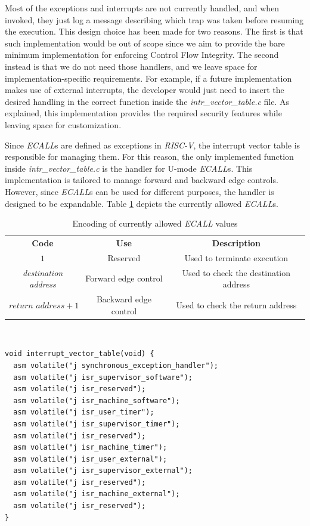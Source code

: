 Most of the exceptions and interrupts are not currently handled, and when invoked,
they just log a message describing which trap was taken before resuming the
execution. This design choice has been made for two reasons. The first is that
such implementation would be out of scope since we aim to provide the bare
minimum implementation for enforcing Control Flow Integrity. The second instead is
that we do not need those handlers, and we leave space for implementation-specific
requirements. For example, if a future implementation makes use of external
interrupts, the developer would just need to insert the desired handling in the correct
function inside the \textit{intr\_vector\_table.c} file. As explained, this
implementation provides the required security features while leaving space for
customization.

Since \textit{ECALL}s are defined as exceptions in \textit{RISC-V}, the
interrupt vector table is responsible for managing them. For this reason, the
only implemented function inside \textit{intr\_vector\_table.c} is the handler for
U-mode \textit{ECALL}s. This implementation is tailored to manage forward and
backward edge controls. However, since \textit{ECALL}s can be used for different
purposes, the handler is designed to be expandable. Table \ref{tab:ecalls}
depicts the currently allowed \textit{ECALL}s.
\begin{table}
  \centering
  \begin{tabular}{|c|c|c|}
    \hline
    \textbf{Code}                & \textbf{Use}          & \textbf{Description}                  \\
    \hhline{===} $1$             & Reserved              & Used to terminate execution           \\
    \hline
    \textit{destination address} & Forward edge control  & Used to check the destination address \\
    \hline
    $\textit{return address}+ 1$ & Backward edge control & Used to check the return address      \\
    \hline
  \end{tabular}
  \caption{Encoding of currently allowed \textit{ECALL} values}
  \label{tab:ecalls}
\end{table}
\\ \begin{lstlisting}[style=CStyle, caption = Interrput Vector Table, label={lst:intrtable}]
void interrupt_vector_table(void) {
  asm volatile("j synchronous_exception_handler");
  asm volatile("j isr_supervisor_software");
  asm volatile("j isr_reserved");
  asm volatile("j isr_machine_software");
  asm volatile("j isr_user_timer");
  asm volatile("j isr_supervisor_timer");
  asm volatile("j isr_reserved");
  asm volatile("j isr_machine_timer");
  asm volatile("j isr_user_external");
  asm volatile("j isr_supervisor_external");
  asm volatile("j isr_reserved");
  asm volatile("j isr_machine_external");
  asm volatile("j isr_reserved");
}
\end{lstlisting}

